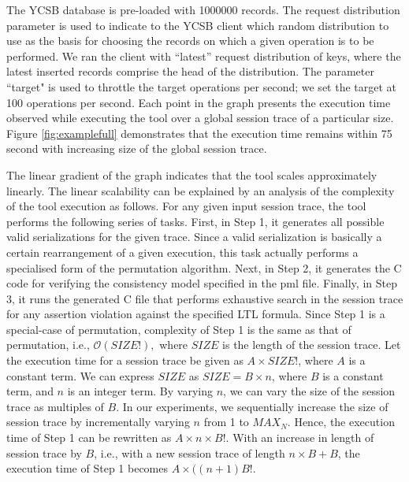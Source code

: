 \documentclass[journal,compsoc]{IEEEtran}
\begin{document}
   The YCSB database is pre-loaded with 1000000 records.  The request distribution parameter is used to indicate to the YCSB client which random distribution to use as the basis for choosing the records on which a given operation is to be performed. We ran the client with ``latest'' request distribution of keys, where the latest inserted records comprise the head of the distribution. The parameter ``target" is used to throttle  the target  operations per second; we set the target at 100  operations per second. 
 Each point in the graph presents the  execution time observed while executing the  tool over a global session trace of a particular size. Figure  \ref{fig:examplefull} demonstrates that the execution time remains within 75 second with increasing size of the global session trace.  
\par The linear gradient of the graph  indicates that the tool scales approximately linearly. 	 The linear scalability can be explained by an analysis of the complexity of the tool execution as follows.  For any given input session trace, the tool performs the following series of tasks.   First, in Step 1, it generates all possible valid serializations for the given trace. Since a valid serialization is basically a certain rearrangement of a given execution, this task actually performs a specialised form of the permutation algorithm.  Next, in Step 2, it generates the C code for verifying the consistency model specified in the pml file.  Finally, in Step 3, it runs the generated C file that performs exhaustive search in the session trace for any assertion violation against the specified LTL formula.  
 Since Step 1 is a special-case of permutation, complexity of Step 1 is the same as that of permutation, i.e., $\mathcal{O}(\mathit{SIZE}!),$ where $\mathit{SIZE}$ is the length of the session trace.  Let the execution time for a session trace be given as $A \times \mathit{SIZE}!$, where $A$ is a constant term. We can express $\mathit{SIZE}$ as $\mathit{SIZE}=B \times n$, where $B$ is a constant term, and $n$ is an integer term. By varying $n$, we can vary the size of the session trace as multiples of $B$. In our experiments, we sequentially increase the size of session trace by incrementally varying $n$ from 1 to $MAX_N$. Hence, the execution time of Step 1 can be rewritten as  $A \times n \times B!$. With an increase in length of session trace by $B$, i.e., with a new session trace of length $n \times B + B$, the execution time of Step 1 becomes $A \times ((n+1)B!$.   %
\end{document}

